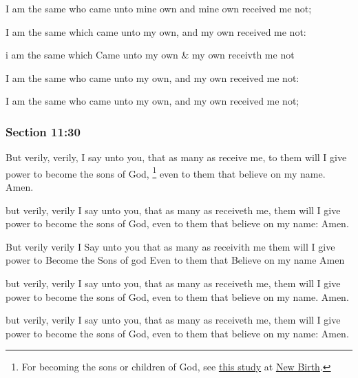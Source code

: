 		I am the same who came unto mine own and mine own received me not;

		\begin{framed}
		\scriptsize
			\begin{compactdesc}
				\item[JSP] I am the same which came unto my own, and my own received me not: 
				\item[HS] i am the same which Came unto my own \& my own receivth me not 
				\item[DC 1835] I am the same who came unto my own, and my own received me not: 
				\item[DC 1844] I am the same who came unto my own, and my own received me not; 
			\end{compactdesc}
		\end{framed}

	\subsubsection{Section 11:30} %
		\label{DC11-30}

		But verily, verily, I say unto you, that as many as receive me, to them will I give power to become the sons of God,%
			\footnote{%
				For becoming the sons or children of God, see \hyperref[NEWBIRTH-sons]{this study} at \hyperref[NEWBIRTH]{New Birth}.
				}
		even to them that believe on my name.  Amen.

		\begin{framed}
		\scriptsize
			\begin{compactdesc}
				\item[JSP] but verily, verily I say unto you, that as many as receiveth me, them will I give power to become the sons of God, even to them that believe on my name: Amen.
				\item[HS] But verily verily I Say unto you that as many as receivith me them will I give power to Become the Sons of god Even to them that Believe on my name Amen
				\item[DC 1835] but verily, verily I say unto you, that as many as receiveth me, them will I give power to become the sons of God, even to them that believe on my name. Amen.
				\item[DC 1844] but verily, verily I say unto you, that as many as receiveth me, them will I give power to become the sons of God, even to them that believe on my name: Amen.
			\end{compactdesc}
		\end{framed}